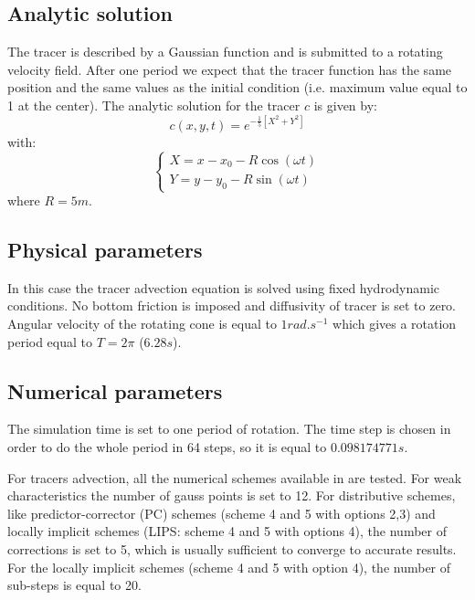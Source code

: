 \subsection{Analytic solution}

The tracer is described by a Gaussian function and is submitted to a rotating velocity field.
After one period we expect that the tracer function has the same position and the same values as the initial condition (i.e. maximum value equal to 1 at the center).
The analytic solution for the tracer $c$ is given by:
\begin{equation*}
c(x,y,t)=e^{-\frac{1}{5}[X^2+Y^2]}
\end{equation*}
with:
\begin{equation*}
\left\{
    \begin{array}{ll}
        X = x - x_0 - R \cos(\omega t) \\
        Y = y - y_0 - R \sin(\omega t)
    \end{array}
\right.
\end{equation*}
where $R=5m$.

\subsection{Physical parameters}

In this case the tracer advection equation is solved using fixed hydrodynamic conditions.
No bottom friction is imposed and diffusivity of tracer is set to zero.
Angular velocity of the rotating cone is equal to $1 rad.s^{-1}$ which gives a rotation period equal to $T=2\pi$ ($6.28s$).

\subsection{Numerical parameters}

The simulation time is set to one period of rotation.
The time step is chosen in order to do the whole period in 64 steps, so it is equal to $0.098174771s$.

For tracers advection, all the numerical schemes available in  are tested.
For weak characteristics the number of gauss points is set to 12. For distributive schemes, like predictor-corrector (PC) schemes (scheme 4 and 5 with options 2,3) and locally implicit schemes (LIPS: scheme 4 and 5 with options 4), the number of corrections is set to 5, which is usually sufficient to converge to accurate results. For the locally implicit schemes (scheme 4 and 5 with option 4), the number of sub-steps is equal to 20.

